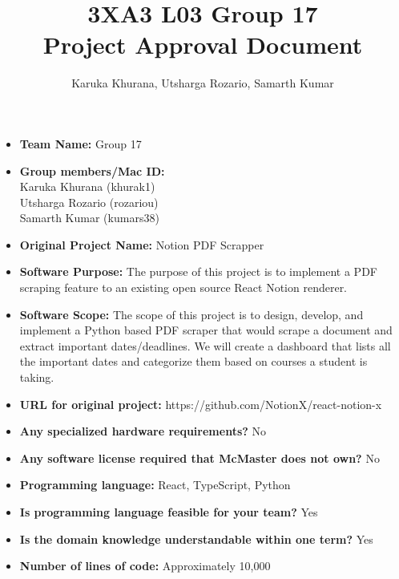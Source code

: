 \documentclass{article}
\title{3XA3 L03 Group 17\\Project Approval Document}
\author{Karuka Khurana, Utsharga Rozario, Samarth Kumar}
\begin{document}
\maketitle

\begin{itemize}
    \item[] \textbf{Team Name:} Group 17

    \item[] \textbf{Group members/Mac ID:}\\
        Karuka Khurana (khurak1)\\
        Utsharga Rozario (rozariou)\\
        Samarth Kumar (kumars38)
        
    \item[] \textbf{Original Project Name:} Notion PDF Scrapper
    
    \item[] \textbf{Software Purpose:} The purpose of this project is to implement a PDF scraping feature to an existing open source React Notion renderer. 

    \item[] \textbf{Software Scope:} The scope of this project is to design, develop, and implement a Python based PDF scraper that would scrape a document and extract important dates/deadlines. We will create a dashboard that lists all the important dates and categorize them based on courses a student is taking. 

    \item[] \textbf{URL for original project:}  https://github.com/NotionX/react-notion-x  

    \item[] \textbf{Any specialized hardware requirements?} No

    \item[] \textbf{Any software license required that McMaster does not own?} No 

    \item[] \textbf{Programming language:} React, TypeScript, Python 

    \item[] \textbf{Is programming language feasible for your team?} Yes 

    \item[] \textbf{Is the domain knowledge understandable within one term?} Yes 

    \item[] \textbf{Number of lines of code:} Approximately 10,000 


\end{itemize}
\end{document}
